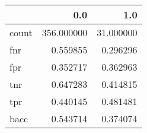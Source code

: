 \begin{tabular}{lrr}
\toprule
{} &         0.0 &        1.0 \\
\midrule
count &  356.000000 &  31.000000 \\
fnr   &    0.559855 &   0.296296 \\
fpr   &    0.352717 &   0.362963 \\
tnr   &    0.647283 &   0.414815 \\
tpr   &    0.440145 &   0.481481 \\
bacc  &    0.543714 &   0.374074 \\
\bottomrule
\end{tabular}
